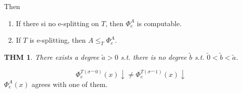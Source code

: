 \documentclass[12pt]{article}
\begin{document}
Then
\begin{enumerate}
  \item If there si no e-splitting on $T$,
    then $\Phi^A_e$ is computable.
  \item If $T$ is e-splitting, then $A \le_T \Phi^A_e$. 
\end{enumerate}

\newtheorem{existsdeg}{THM}
\begin{existsdeg}
  There exists a degree $\utilde{a} > 0$ s.t. 
  there is no degree $\utilde{b}$ s.t. $\utilde{0} < \utilde{b} < \utilde{a}$.
\end{existsdeg}

\[
\Phi_e^{T(\sigma\frown 0)}(x)\downarrow \ne 
\Phi_e^{T(\sigma\frown 1)}(x)\downarrow
\]
$\Phi_e^{A}(x)$ agrees with one of them.
\end{document}
